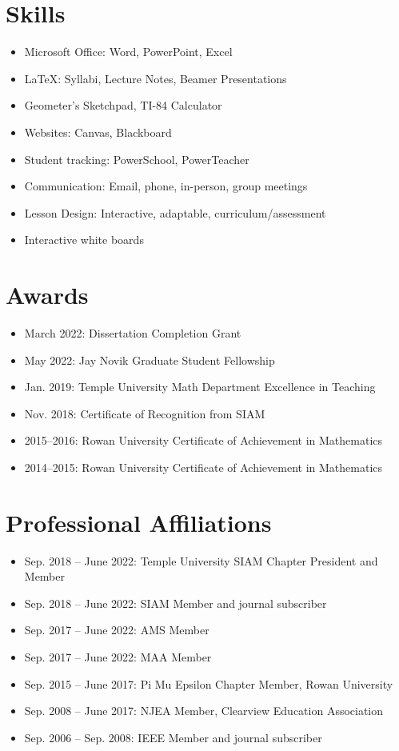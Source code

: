 \documentclass[11pt]{article}
\begin{document}
\section*{Skills}
\begin{itemize}[leftmargin=*]
    \item Microsoft Office: Word, PowerPoint, Excel
    \item LaTeX: Syllabi, Lecture Notes, Beamer Presentations
    \item Geometer’s Sketchpad, TI-84 Calculator
    \item Websites: Canvas, Blackboard
    \item Student tracking: PowerSchool, PowerTeacher
    \item Communication: Email, phone, in-person, group meetings
    \item Lesson Design: Interactive, adaptable, curriculum/assessment
    \item Interactive white boards
\end{itemize}

\section*{Awards}
\begin{itemize}[leftmargin=*]
    \item March 2022: Dissertation Completion Grant
    \item May 2022: Jay Novik Graduate Student Fellowship
    \item Jan. 2019: Temple University Math Department Excellence in Teaching
    \item Nov. 2018: Certificate of Recognition from SIAM
    \item 2015--2016: Rowan University Certificate of Achievement in Mathematics
    \item 2014--2015: Rowan University Certificate of Achievement in Mathematics
\end{itemize}

\section*{Professional Affiliations}
\begin{itemize}[leftmargin=*]
    \item Sep. 2018 -- June 2022: Temple University SIAM Chapter President and Member
    \item Sep. 2018 -- June 2022: SIAM Member and journal subscriber
    \item Sep. 2017 -- June 2022: AMS Member
    \item Sep. 2017 -- June 2022: MAA Member
    \item Sep. 2015 -- June 2017: Pi Mu Epsilon Chapter Member, Rowan University
    \item Sep. 2008 -- June 2017: NJEA Member, Clearview Education Association
    \item Sep. 2006 -- Sep. 2008: IEEE Member and journal subscriber
\end{itemize}
\end{document}
